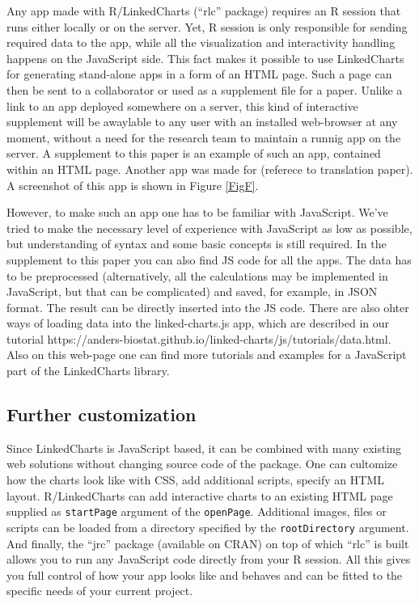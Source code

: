 \documentclass[twocolumn,10pt]{article}
\begin{document}
Any app made with R/LinkedCharts (``rlc'' package) requires an R session that runs either locally or on the server. Yet, R session is only responsible for sending required data to the app, while all the visualization and interactivity handling happens on the JavaScript side. This fact makes it possible to use LinkedCharts for generating stand-alone apps in a form of an HTML page. Such a page can then be sent to a collaborator or used as a supplement file for a paper. Unlike a link to an app deployed somewhere on a server, this kind of interactive supplement will be awaylable to any user with an installed web-browser at any moment, without a need for the research team to maintain a runnig app on the server. A supplement to this paper is an example of such an app, contained within an HTML page. Another app was made for (referece to translation paper). A screenshot of this app is shown in Figure \ref{FigF}.

However, to make such an app one has to be familiar with JavaScript. We've tried to make the necessary level of experience with JavaScript as low as possible, but understanding of syntax and some basic concepts is still required. In the supplement to this paper you can also find JS code for all the apps. The data has to be preprocessed (alternatively, all the calculations may be implemented in JavaScript, but that can be complicated) and saved, for example, in JSON format. The result can be directly inserted into the JS code. There are also ohter ways of loading data into the linked-charts.js app, which are described in our tutorial https://anders-biostat.github.io/linked-charts/js/tutorials/data.html. Also on this web-page one can find more tutorials and examples for a JavaScript part of the LinkedCharts library.

\subsection{Further customization}

Since LinkedCharts is JavaScript based, it can be combined with many existing web solutions without changing source code of the package. One can cultomize how the charts look like with CSS, add additional scripts, specify an HTML layout. R/LinkedCharts can add interactive charts to an existing HTML page supplied as \texttt{startPage} argument of the \texttt{openPage}. Additional images, files or scripts can be loaded from a directory specified by the \texttt{rootDirectory} argument. And finally, the ``jrc'' package (available on CRAN) on top of which ``rlc'' is built allows you to run any JavaScript code directly from your R session.
All this gives you full control of how your app looks like and behaves and can be fitted to the specific needs of your current project.

\begin{small} 
\balance

\end{small}
\end{document}

